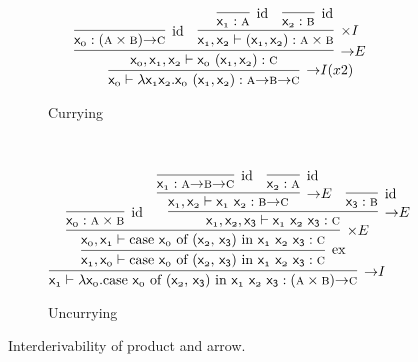 \begin{figure}
	\centering
	\begin{subfigure}{1\textwidth}
		\[
		\infer[\ii I (x2)]{\term{\Var{0}} \vdash \term{\lam \Var{1}\Var{2}.\Var{0}~(\term{\Var{1}},\term{\Var{2}})}: \prop{a} \ii \prop{b} \ii \prop{c}}{
			\infer[\ii E]{\term{\Var{0}}, \term{\Var{1}}, \term{\Var{2}} \vdash \term{\Var{0}}~(\term{\Var{1}}, \term{\Var{2}}): \prop{c}}{
				\infer[\Ax]{\term{\Var{0}}: (\prop{a} \times \prop{b}) \ii \prop{c}}{}
				&
				\infer[\times I]{ \term{\Var{1}}, \term{\Var{2}} \vdash (\term{\Var{1}},\term{\Var{2}}): \prop{a} \times \prop{b}}{
					\infer[\Ax]{\term{\Var{1}}: \prop{a}}{}
					&			
					\infer[\Ax]{\term{\Var{2}}: \prop{b}}{}
				}
			}
		}
		\]
		\caption{Currying}
		\label{subfigure:currying}
	\end{subfigure}\\[\midsep]
	\begin{subfigure}{1\textwidth}
		\[
			\infer[\ii I]{\term{\Var{1}} \vdash \term{\lam \Var{0}.}\cterm{case \term{\Var{0}} of (\term{\Var{2}}, \term{x_3}) in \term{\Var{1}~\Var{2}~x_3}}:(\prop{a} \times \prop{b})\ii \prop{c}}{
				\infer[\Exchange{}]{\term{\Var{1}}, \term{\Var{0}}  \vdash \cterm{case \term{\Var{0}} of (\term{\Var{2}}, \term{x_3}) in \term{\Var{1}~\Var{2}~x_3}}:\prop{c}}{
					\infer[\times E]{\term{\Var{0}}, \term{\Var{1}} \vdash \cterm{case \term{\Var{0}} of (\term{\Var{2}}, \term{x_3}) in \term{\Var{1}~\Var{2}~x_3}}:\prop{c}}{
						\infer[\Ax]{\term{\Var{0}}: \prop{a} \times \prop{b}}{}
						&
						\infer[\ii E]{\term{\Var{1}}, \term{\Var{2}}, \term{x_3} \vdash \term{\Var{1}~\Var{2}~x_3}: \prop{c}}{
							\infer[\ii E]{\term{\Var{1}}, \term{\Var{2}} \vdash \term{\Var{1}~\Var{2}}: \prop{b} \ii \prop{c}}{
								\infer[\Ax]{\term{\Var{1}}: \prop{a} \ii \prop{b} \ii \prop{c}}{}
								&
								\infer[\Ax]{\term{\Var{2}}: \prop{a}}{}
							}
							&
							\infer[\Ax]{\term{x_3}: \prop{b}}{}
						}
					}
				}
			}
		\]
		\caption{Uncurrying}
		\label{subfigure:uncurrying}
	\end{subfigure}
	\caption{Interderivability of product and arrow.}
	\label{figure:curry_uncurry}
\end{figure}

